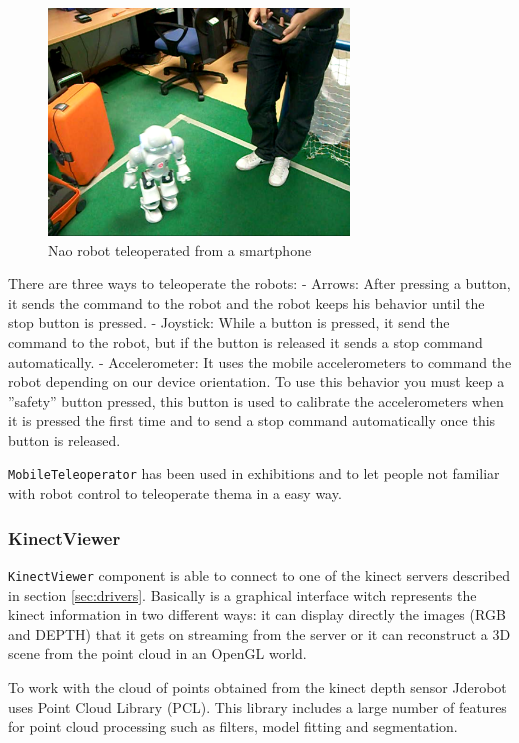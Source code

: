 \documentclass[twocolumn]{svjour3}          %
\begin{document}
\begin{figure}[h!]
  \includegraphics[width=8cm]{teleoperator-nao.png}
\caption{Nao robot teleoperated from a smartphone}
\label{fig:nao-teleoperator}
\end{figure}

There are three ways to teleoperate the robots:
- Arrows: After pressing a button, it sends the command to the robot and the robot keeps his behavior until the stop button is pressed.
- Joystick: While a button is pressed, it send the command to the robot, but if the button is released it sends a stop command automatically.
- Accelerometer: It uses the mobile accelerometers to command the robot depending on our device orientation. To use this behavior you must keep a ''safety'' button pressed, this button is used to calibrate the accelerometers when it is pressed the first time and to send a stop command automatically once this button is released.

\texttt{MobileTeleoperator} has been used in exhibitions and to let people not familiar with robot control to teleoperate thema in a easy way.

\subsubsection{KinectViewer}

\texttt{KinectViewer} component is able to connect to one of the kinect servers described in section \ref{sec:drivers}. Basically is a graphical interface witch represents the kinect information in two different ways: it can display directly the images (RGB and DEPTH) that it gets on streaming from the server or it can reconstruct a 3D scene from the point cloud in an OpenGL world. 

To work with the cloud of points obtained from the kinect depth sensor Jderobot uses Point Cloud Library (PCL). This library includes a large number of features for point cloud processing such as filters, model fitting and segmentation. 
\end{document}
